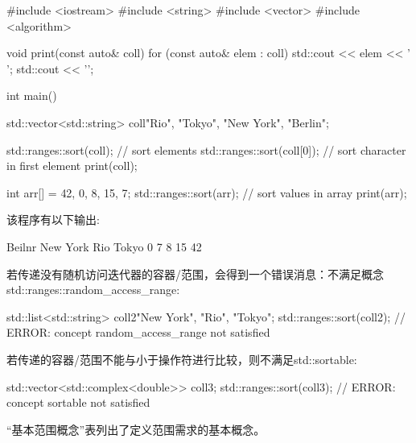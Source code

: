 
\begin{cpp}
#include <iostream>
#include <string>
#include <vector>
#include <algorithm>

void print(const auto& coll) {
	for (const auto& elem : coll) {
		std::cout << elem << ' ';
	}
	std::cout << '\n';
}

int main()
{
	std::vector<std::string> coll{"Rio", "Tokyo", "New York", "Berlin"};
	
	std::ranges::sort(coll); // sort elements
	std::ranges::sort(coll[0]); // sort character in first element
	print(coll);
	
	int arr[] = {42, 0, 8, 15, 7};
	std::ranges::sort(arr); // sort values in array
	print(arr);
}
\end{cpp}

该程序有以下输出:

\begin{shell}
Beilnr New York Rio Tokyo
0 7 8 15 42
\end{shell}

若传递没有随机访问迭代器的容器/范围，会得到一个错误消息：不满足概念std::ranges::random\_access\_range:

\begin{cpp}
std::list<std::string> coll2{"New York", "Rio", "Tokyo"};
std::ranges::sort(coll2); // ERROR: concept random_access_range not satisfied
\end{cpp}

若传递的容器/范围不能与小于操作符进行比较，则不满足std::sortable:

\begin{cpp}
std::vector<std::complex<double>> coll3;
std::ranges::sort(coll3); // ERROR: concept sortable not satisfied
\end{cpp}


“基本范围概念”表列出了定义范围需求的基本概念。

